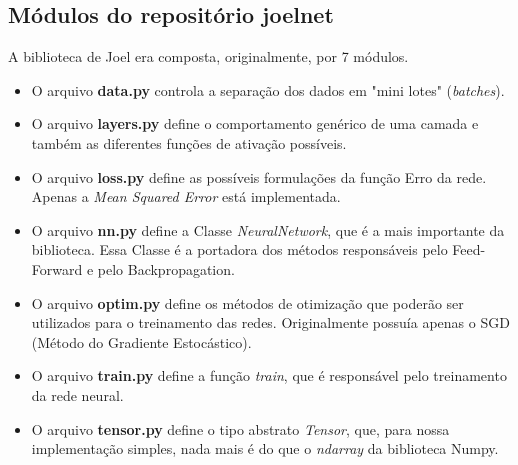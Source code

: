 \documentclass[11pt]{article}
\begin{document}
\subsection*{Módulos do repositório joelnet}
A biblioteca de Joel era composta, originalmente, por 7 módulos.
\begin{itemize}
\item O arquivo \textbf{data.py} controla a separação dos dados em "mini lotes" (\textit{batches}).

\item O arquivo \textbf{layers.py} define o comportamento genérico de uma camada e também as diferentes funções de ativação possíveis.

\item O arquivo \textbf{loss.py} define as possíveis formulações da função Erro da rede. Apenas a \textit{Mean Squared Error} está implementada.

\item O arquivo \textbf{nn.py} define a Classe \textit{NeuralNetwork}, que é a mais importante da biblioteca. Essa Classe é a portadora dos métodos responsáveis pelo Feed-Forward e pelo Backpropagation.

\item O arquivo \textbf{optim.py} define os métodos de otimização que poderão ser utilizados para o treinamento das redes. Originalmente possuía apenas o SGD (Método do Gradiente Estocástico).
\item  O arquivo \textbf{train.py} define a função \textit{train}, que é responsável pelo treinamento da rede neural.

\item O arquivo \textbf{tensor.py} define o tipo abstrato \textit{Tensor}, que, para nossa implementação simples, nada mais é do que o \textit{ndarray} da biblioteca Numpy.
\end{itemize}
\end{document}
